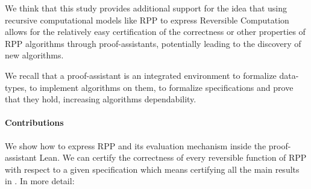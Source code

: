 \documentclass[preprint]{elsarticle}
\theoremstyle{remark}
\newcommand{\RPP}{\textsf{RPP}\xspace}
\newcommand{\LEAN}{\textsf{Lean}\xspace}
\begin{document}
We think that this study provides additional support for the idea that using recursive computational models like \RPP to express Reversible Computation allows for the relatively easy certification of the correctness or other properties of \RPP algorithms through proof-assistants, potentially leading to the discovery of new algorithms.

We recall that a proof-assistant is an integrated environment to formalize data-types, to implement algorithms on them, to formalize specifications and prove that they hold, increasing algorithms dependability.

\paragraph{Contributions}
We show how to express \RPP and its evaluation mechanism inside the proof-assistant \LEAN \cite{Lean3}. We can certify the correctness of every reversible function of \RPP with respect to a given specification which means certifying all the main results in \cite{DBLP:journals/tcs/PaoliniPR20}. In more detail:
\end{document}

